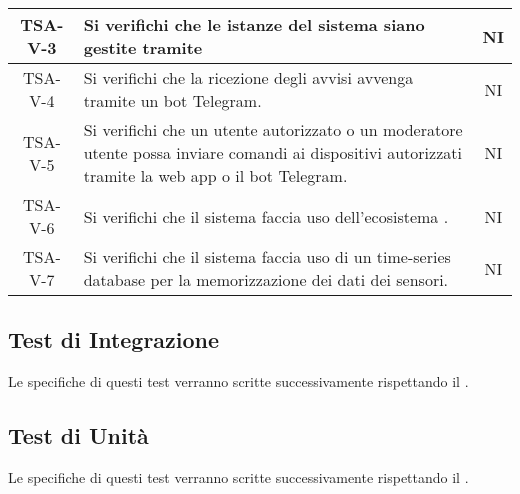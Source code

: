 \begin{center}
\begin{longtable}{|c|p{10cm}|c|}
			 \hline
			 TSA-V-3 & Si verifichi che le istanze del sistema siano gestite tramite \glock{Docker} & NI \\
			 \hline 
			 TSA-V-4 & Si verifichi che la ricezione degli avvisi avvenga tramite un bot Telegram. & NI \\
			 \hline
			 TSA-V-5 & Si verifichi che un utente autorizzato o un moderatore utente possa inviare comandi ai dispositivi autorizzati tramite la web app o il bot Telegram. & NI \\
			 \hline
			 TSA-V-6 & Si verifichi che il sistema faccia uso dell'ecosistema \glock{Kafka}. & NI \\
			 \hline
			 TSA-V-7 & Si verifichi che il sistema faccia uso di un time-series database per la memorizzazione dei dati dei sensori. & NI \\
			 \hline 

			\end{longtable}
		\end{center}


	\subsection{Test di Integrazione}
		Le specifiche di questi test verranno scritte successivamente rispettando il . 

	\subsection{Test di Unità}
	 	Le specifiche di questi test verranno scritte successivamente rispettando il . 
